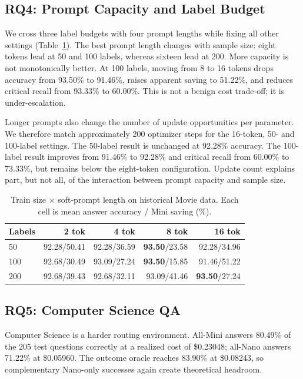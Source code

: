 \subsection{RQ4: Prompt Capacity and Label Budget}

We cross three label budgets with four prompt lengths while fixing all other
settings (Table~\ref{tab:size-grid}). The best prompt length changes with
sample size: eight tokens lead at 50 and 100 labels, whereas sixteen lead at
200. More capacity is not monotonically better. At 100 labels, moving from 8 to
16 tokens drops accuracy from 93.50\% to 91.46\%, raises apparent saving to
51.22\%, and reduces critical recall from 93.33\% to 60.00\%. This is not a
benign cost trade-off; it is under-escalation.

Longer prompts also change the number of update opportunities per parameter.
We therefore match approximately 200 optimizer steps for the 16-token, 50- and
100-label settings. The 50-label result is unchanged at 92.28\% accuracy. The
100-label result improves from 91.46\% to 92.28\% and critical recall from
60.00\% to 73.33\%, but remains below the eight-token configuration. Update
count explains part, but not all, of the interaction between prompt capacity and
sample size.

\begin{table}[t]
  \centering
  \small
  \caption{Train size $\times$ soft-prompt length on historical Movie data.
  Each cell is mean answer accuracy / Mini saving (\%).}
  \label{tab:size-grid}
  \begin{tabular}{lrrrr}
    \toprule
    Labels & 2 tok & 4 tok & 8 tok & 16 tok\\
    \midrule
    50  & 92.28/50.41 & 92.28/36.59 & \textbf{93.50}/23.58 & 92.28/34.96\\
    100 & 92.68/30.49 & 93.09/27.24 & \textbf{93.50}/15.85 & 91.46/51.22\\
    200 & 92.68/39.43 & 92.68/32.11 & 93.09/41.46 & \textbf{93.50}/27.24\\
    \bottomrule
  \end{tabular}
\end{table}

\subsection{RQ5: Computer Science QA}

Computer Science is a harder routing environment. All-Mini answers 80.49\% of
the 205 test questions correctly at a realized cost of \$0.23048; all-Nano
answers 71.22\% at \$0.05960. The outcome oracle reaches 83.90\% at \$0.08243,
so complementary Nano-only successes again create theoretical headroom.

